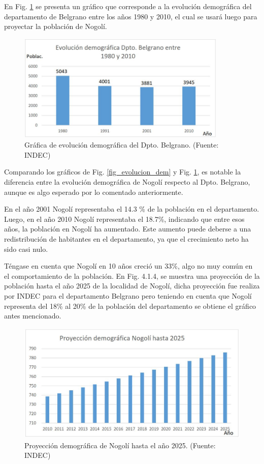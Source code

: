 \documentclass[12pt,a4paper]{book}
\begin{document}
En Fig. \ref{fig_evolucion_dpto_dem} se presenta un gráfico que corresponde a la evolución demográfica del departamento de Belgrano entre los años 1980 y 2010, el cual se usará luego para proyectar la población de Nogolí.

\begin{figure} [H]
\centering
\includegraphics[width= 10cm]{../figuras/4_1_Fig3.jpg}
\caption{Gráfica de evolución demográfica del Dpto. Belgrano. (Fuente: INDEC)}
\label{fig_evolucion_dpto_dem}
\end{figure}	


Comparando los gráficos de Fig. \ref{fig_evolucion_dem} y Fig. \ref{fig_evolucion_dpto_dem}, es notable la diferencia entre la evolución demográfica de Nogolí respecto al Dpto. Belgrano, aunque es algo esperado por lo comentado anteriormente.

En el año 2001 Nogolí representaba el 14.3 \% de la población en el departamento. Luego, en el año 2010 Nogolí representaba el 18.7\%, indicando que entre esos años, la población en Nogolí ha aumentado. Este aumento puede deberse a una redistribución de habitantes en el departamento, ya que el crecimiento neto ha sido casi nulo.

Téngase en cuenta que Nogolí en 10 años creció un 33\%, algo no muy común en el comportamiento de la población. En Fig. 4.1.4, se muestra una proyección de la población hasta el año 2025 de la localidad de Nogolí, dicha proyección fue realiza por INDEC para el departamento Belgrano pero teniendo en cuenta que Nogolí representa del 18\% al 20\% de la población del departamento se obtiene el gráfico antes mencionado.


\begin{figure} [H]
\centering
\includegraphics[width= 12cm]{../figuras/4_1_Fig4.jpg}
\caption{Proyección demográfica de Nogolí hasta el año 2025. (Fuente: INDEC)}
\label{fig_proy_25_dem}
\end{figure}
\end{document}
